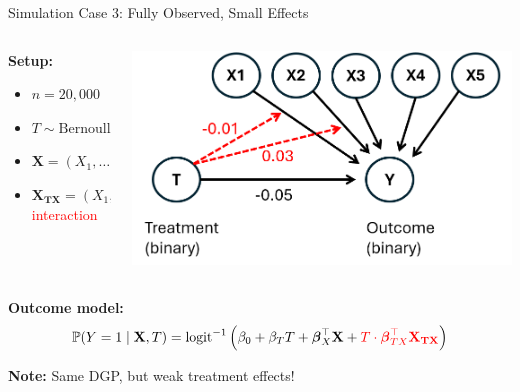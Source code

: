 \documentclass[onlytextwidth,english]{beamer}\usepackage[]{graphicx}\usepackage[]{xcolor}
\begin{document}
\begin{frame}{Simulation Case 3: Fully Observed, Small Effects}

\begin{columns}

\begin{column}{0.52\textwidth}

\vspace{-0.5em}
\textbf{Setup:}
\begin{itemize}\setlength\itemsep{0.4em}
  \item $n = 20{,}000$
  \item $T \sim \text{Bernoulli}(0.5)$
  \item $\mathbf{X} = (X_1, \dots, X_5)^\top \sim \mathcal{N}(\mathbf{0}, \Sigma)$\\
  \item $\mathbf{X_{TX}} = (X_1, X_2)^\top$ \textcolor{red}{interaction}
\end{itemize}


\end{column}

\begin{column}{0.42\textwidth}
    \includegraphics[width=\textwidth]{img/simulation_small_effects.png}
\end{column}

\end{columns}


\vspace{0.3em}
\textbf{Outcome model:}
\[
\mathbb{P}(Y = 1 \mid \mathbf{X}, T) = \text{logit}^{-1} \left(
\beta_0 + \beta_T T + \boldsymbol{\beta}_X^\top \mathbf{X}
+ \textcolor{red}{T \cdot \boldsymbol{\beta}_{TX}^\top \mathbf{X_{TX}}}
\right)
\]

\textbf{Note:} Same DGP, but weak treatment effects!


\end{frame}
\end{document}
